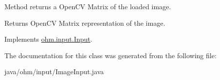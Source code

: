 Method returns a Open\+CV Matrix of the loaded image. \begin{DoxyReturn}{Returns}
Open\+CV Matrix representation of the image. 
\end{DoxyReturn}


Implements \hyperlink{interfaceohm_1_1input_1_1_input_ac9877f2cacdb85c06af084fd426495fd}{ohm.\+input.\+Input}.



The documentation for this class was generated from the following file\+:\begin{DoxyCompactItemize}
\item 
java/ohm/input/Image\+Input.\+java\end{DoxyCompactItemize}
